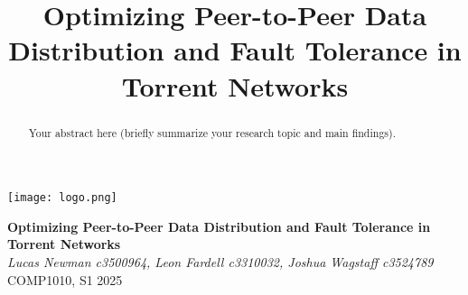\documentclass[a0,landscape]{a0poster}
\title{Optimizing Peer-to-Peer Data Distribution and Fault Tolerance in Torrent Networks}
\begin{document}
\maketitle

\begin{center}
    \begin{minipage}{0.15\textwidth}
        \texttt{[image: logo.png]} 
    \end{minipage}%
    \hfill
    \begin{minipage}{0.85\textwidth}
        \vspace{-0.5cm}
        \centering
        \huge \textbf{Optimizing Peer-to-Peer Data Distribution and Fault Tolerance in Torrent Networks} \\
        \vspace{0.3cm}
        \textit{Lucas Newman c3500964, Leon Fardell c3310032, Joshua Wagstaff c3524789} \\ %
        \vspace{0.3cm}
        \small COMP1010, S1 2025
    \end{minipage}
\end{center}

\begin{abstract}
Your abstract here (briefly summarize your research topic and main findings).
\end{abstract}
\end{document}

